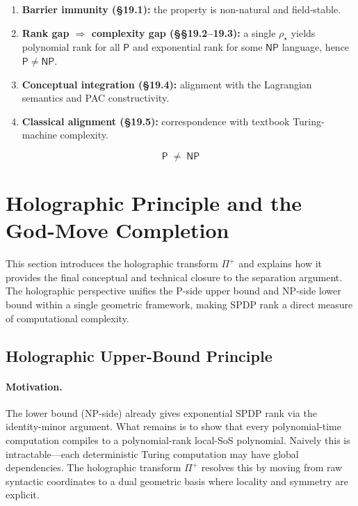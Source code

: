 \documentclass[12pt]{article}
\theoremstyle{definition}
\theoremstyle{definition}
\theoremstyle{remark}
\theoremstyle{remark}
\begin{document}
\begin{enumerate}
\item \textbf{Barrier immunity (\S19.1):} the property is non-natural and field-stable.
\item \textbf{Rank gap $\Rightarrow$ complexity gap (\S\S19.2--19.3):} a single $\rho_\star$ yields polynomial rank for all $\mathsf{P}$ and exponential rank for some $\mathsf{NP}$ language, hence $\mathsf{P}\neq\mathsf{NP}$.
\item \textbf{Conceptual integration (\S19.4):} alignment with the Lagrangian semantics and PAC constructivity.
\item \textbf{Classical alignment (\S19.5):} correspondence with textbook Turing-machine complexity.
\end{enumerate}

\[
\boxed{\mathsf{P}\;\neq\;\mathsf{NP}}
\]


\section{Holographic Principle and the God-Move Completion}
\label{sec:holographic-principle}

This section introduces the holographic transform $\Pi^+$ and explains how it provides the final conceptual and technical closure to the separation argument. The holographic perspective unifies the P-side upper bound and NP-side lower bound within a single geometric framework, making SPDP rank a direct measure of computational complexity.

\subsection{Holographic Upper-Bound Principle}

\paragraph{Motivation.}
The lower bound (NP-side) already gives exponential SPDP rank via the identity-minor argument. What remains is to show that every polynomial-time computation compiles to a polynomial-rank local-SoS polynomial. Naively this is intractable---each deterministic Turing computation may have global dependencies. The holographic transform $\Pi^+$ resolves this by moving from raw syntactic coordinates to a dual geometric basis where locality and symmetry are explicit.
\end{document}

